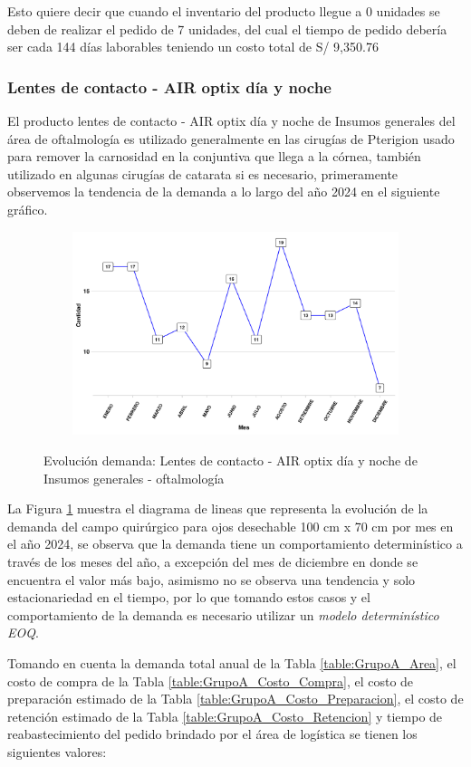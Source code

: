 Esto quiere decir que cuando el inventario del producto llegue a 0 unidades se deben de realizar el pedido de 7 unidades, del cual el tiempo de pedido debería ser cada 144 días laborables teniendo un costo total de S/ 9,350.76
\subsubsection{Lentes de contacto - AIR optix día y noche}

El producto lentes de contacto - AIR optix día y noche de Insumos generales del área de oftalmología es utilizado generalmente en las cirugías de Pterigion usado para remover la carnosidad en la conjuntiva que llega a la córnea, también utilizado en algunas cirugías de catarata si es necesario, primeramente observemos la tendencia de la demanda a lo largo del año 2024 en el siguiente gráfico.

\begin{figure}[H]
  \caption{Evolución demanda: Lentes de contacto - AIR optix día y noche de Insumos generales - oftalmología}
  {\includegraphics[width=15cm, height=5.95cm]{images/PROD013_demanda.pdf}}
  \label{fig:PROD013_demanda}
\end{figure}

La Figura \ref{fig:PROD013_demanda} muestra el diagrama de lineas que representa la evolución de la demanda del campo quirúrgico para ojos desechable 100 cm x 70 cm por mes en el año 2024, se observa que la demanda tiene un comportamiento determinístico a través de los meses del año, a excepción del mes de diciembre en donde se encuentra el valor más bajo, asimismo no se observa una tendencia y solo estacionariedad en el tiempo, por lo que tomando estos casos y el comportamiento de la demanda es necesario utilizar un \textsl{modelo determinístico EOQ}.

Tomando en cuenta la demanda total anual de la Tabla \ref{table:GrupoA_Area}, el costo de compra de la Tabla \ref{table:GrupoA_Costo_Compra}, el costo de preparación estimado de la Tabla \ref{table:GrupoA_Costo_Preparacion}, el costo de retención estimado de la Tabla \ref{table:GrupoA_Costo_Retencion} y tiempo de reabastecimiento del pedido brindado por el área de logística se tienen los siguientes valores:

